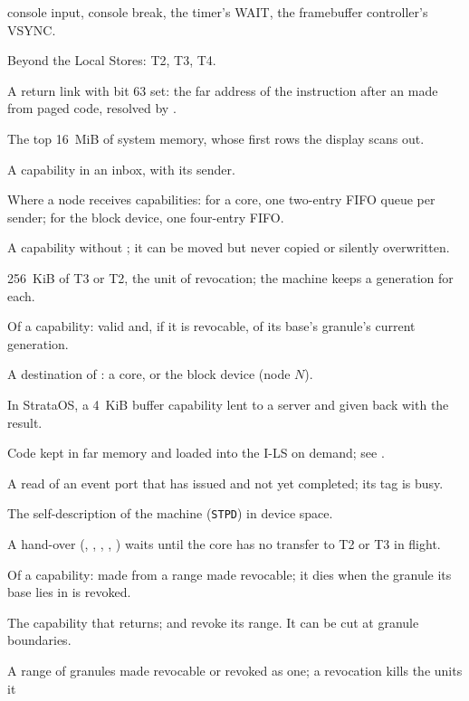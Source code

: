 \begin{description}[leftmargin=1em,style=nextline]
  console input, console break, the timer's WAIT, the framebuffer controller's VSYNC.
\item[Far] Beyond the Local Stores: T2, T3, T4.
\item[Far link] A return link with bit 63 set: the far address of the instruction after an 
  made from paged code, resolved by .
\item[Framebuffer] The top 16~MiB of system memory, whose first rows the display scans out.
\item[Gift] A capability in an inbox, with its sender.
\item[Inbox] Where a node receives capabilities: for a core, one two-entry FIFO queue per sender; for the block device, one four-entry FIFO.
\item[Linear] A capability without ; it can be moved but never copied or silently overwritten.
\item[Granule] 256~KiB of T3 or T2, the unit of revocation; the machine keeps a generation for each.
\item[Live] Of a capability: valid and, if it is revocable, of its base's granule's current
  generation.
\item[Node] A destination of : a core, or the block device (node $N$).
\item[Message] In StrataOS, a 4~KiB buffer capability lent to a server and given back with the result.
\item[Overlay] Code kept in far memory and loaded into the I-LS on demand; see .
\item[Pending device read] A read of an event port that has issued and not yet completed; its tag is
  busy.
\item[Platform table] The self-description of the machine (\texttt{STPD}) in device space.
\item[Publication rule] A hand-over (, , , ,
  ) waits until the core has no transfer to T2 or T3 in flight.
\item[Revocable] Of a capability: made from a range  made revocable; it dies when the
  granule its base lies in is revoked.
\item[Revoker] The  capability that  returns;  and  revoke
  its range. It can be cut at granule boundaries.
\item[Unit] A range of granules made revocable or revoked as one; a revocation kills the units it

\end{description}
